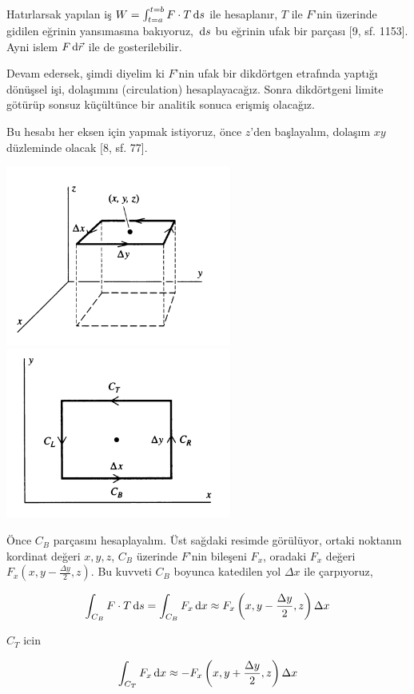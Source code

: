 \documentclass[12pt,fleqn]{article}\usepackage{../../common}
\begin{document}
Hatırlarsak yapılan iş $W = \int_{t=a}^{t=b} F \cdot T \,\mathrm{d} s$ ile hesaplanır,
$T$ ile $F$'nin üzerinde gidilen eğrinin yansımasına bakıyoruz, $\,\mathrm{d} s$ bu
eğrinin ufak bir parçası [9, sf. 1153]. Ayni islem $F \,\mathrm{d} \vec{r}$ ile de
gosterilebilir.

Devam edersek, şimdi diyelim ki $F$'nin ufak bir dikdörtgen etrafında yaptığı
dönüşsel işi, dolaşımını (circulation) hesaplayacağız. Sonra dikdörtgeni limite
götürüp sonsuz küçültünce bir analitik sonuca erişmiş olacağız.

Bu hesabı her eksen için yapmak istiyoruz, önce $z$'den başlayalım, dolaşım $xy$
düzleminde olacak [8, sf. 77].

\includegraphics[width=20em]{calc_multi_70_div_curl_lap_07.png}
\includegraphics[width=20em]{calc_multi_70_div_curl_lap_08.png}

Önce $C_B$ parçasını hesaplayalım. Üst sağdaki resimde görülüyor, ortaki
noktanın kordinat değeri $x,y,z$, $C_B$ üzerinde $F$'nin bileşeni $F_x$, oradaki
$F_x$ değeri $F_x(x,y-\frac{\Delta y}{2}, z)$. Bu kuvveti $C_B$ boyunca
katedilen yol $\Delta x$ ile çarpıyoruz,

$$
\int_{C_B} F \cdot T \,\mathrm{d} s =
\int_{C_B} F_x \,\mathrm{d} x \approx
F_x \left( x,y-\frac{\Delta y}{2}, z \right) \Delta x
$$

$C_T$ icin

$$
\int_{C_T} F_x \,\mathrm{d} x \approx -F_x \left(x,y+\frac{\Delta y}{2}, z \right) \Delta x
$$
\end{document}
